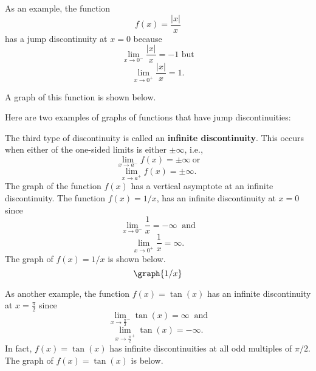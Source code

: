 \documentclass{ximera}
\begin{document}
As an example, the function 
\[f(x) = \frac{|x|}{x}\]
 has a jump discontinuity at $x = 0$ because
\[\lim_{x \to 0^-} \frac{|x|}{x} = -1 \text{  but} \]
\[\lim_{x \to 0^+} \frac{|x|}{x} = 1. \]

A graph of this function is shown below.



Here are two examples of graphs of functions that have jump discontinuities:

\begin{center}
\hspace{1.5 in}
\end{center}


The third type of discontinuity is called an \textbf{infinite discontinuity}. 
This occurs when either of the one-sided limits is either $\pm \infty$, i.e., 
\[\lim_{x \to a^-} f(x) = \pm\infty \ \text{or}  \]
\[\lim_{x \to a^+} f(x) = \pm\infty. \]
The graph of the function $f(x)$ has a vertical asymptote at an infinite discontinuity.
The function $f(x) = 1/x$,  has an infinite discontinuity at $x=0$ since
\[\lim_{x \to 0^-} \frac{1}{x} = -\infty \ \text {  and}\]
\[\lim_{x \to 0^+} \frac{1}{x} = \infty.\]
The graph of $f(x) = 1/x$ is shown below.
\[
\graph{1/x}
\]

As another example, the function $f(x) = \tan(x)$ has an infinite discontinuity at $x = \frac{\pi}{2}$
since
\[\lim_{x \to \frac{\pi}{2}^-} \tan(x) = \infty \ \text {  and}\]
\[\lim_{x \to \frac{\pi}{2}^+} \tan(x) = -\infty.\]
In fact, $f(x) = \tan(x)$ has infinite discontinuities at all odd multiples of $\pi/2$. 
The graph of $f(x) = \tan(x)$ is below.
\end{document}
